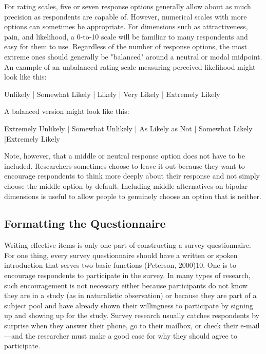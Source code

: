 For rating scales, five or seven response options generally allow about as much precision as respondents are capable of. However, numerical scales with more options can sometimes be appropriate. For dimensions such as attractiveness, pain, and likelihood, a 0-to-10 scale will be familiar to many respondents and easy for them to use. Regardless of the number of response options, the most extreme ones should generally be "balanced" around a neutral or modal midpoint. An example of an unbalanced rating scale measuring perceived likelihood might look like this:

\color{fgcolor}\begin{kframe}
Unlikely | Somewhat Likely | Likely | Very Likely | Extremely Likely
\end{kframe}

A balanced version might look like this:

\color{fgcolor}\begin{kframe}
Extremely Unlikely | Somewhat Unlikely | As Likely as Not | Somewhat Likely |Extremely Likely
\end{kframe}


Note, however, that a middle or neutral response option does not have to be included. Researchers sometimes choose to leave it out because they want to encourage respondents to think more deeply about their response and not simply choose the middle option by default. Including middle alternatives on bipolar dimensions is useful to allow people to genuinely choose an option that is neither.

\subsection{Formatting the Questionnaire}

Writing effective items is only one part of constructing a survey questionnaire. For one thing, every survey questionnaire should have a written or spoken introduction that serves two basic functions (Peterson, 2000)10. One is to encourage respondents to participate in the survey. In many types of research, such encouragement is not necessary either because participants do not know they are in a study (as in naturalistic observation) or because they are part of a subject pool and have already shown their willingness to participate by signing up and showing up for the study. Survey research usually catches respondents by surprise when they answer their phone, go to their mailbox, or check their e-mail---and the researcher must make a good case for why they should agree to participate.

